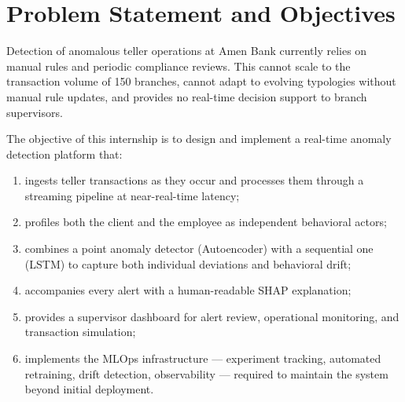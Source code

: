 \section{Problem Statement and Objectives}

Detection of anomalous teller operations at Amen Bank currently relies on manual rules and periodic compliance reviews. This cannot scale to the transaction volume of 150 branches, cannot adapt to evolving typologies without manual rule updates, and provides no real-time decision support to branch supervisors.

The objective of this internship is to design and implement a real-time anomaly detection platform that:

\begin{enumerate}
  \item ingests teller transactions as they occur and processes them through a streaming pipeline at near-real-time latency;
  \item profiles both the client and the employee as independent behavioral actors;
  \item combines a point anomaly detector (Autoencoder) with a sequential one (LSTM) to capture both individual deviations and behavioral drift;
  \item accompanies every alert with a human-readable SHAP explanation;
  \item provides a supervisor dashboard for alert review, operational monitoring, and transaction simulation;
  \item implements the MLOps infrastructure --- experiment tracking, automated retraining, drift detection, observability --- required to maintain the system beyond initial deployment.
\end{enumerate}
